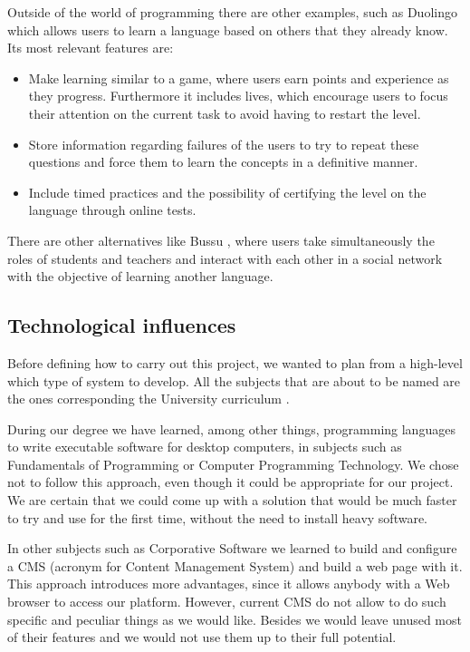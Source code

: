Outside of the world of programming there are other examples, such as Duolingo \cite{duolingo} which allows users to learn a language based on others that they already know. Its most relevant features are:

\begin{itemize}
\item
Make learning similar to a game, where users earn points and experience as they progress. Furthermore it includes lives, which encourage users to focus their attention on the current task to avoid having to restart the level.

\item
Store information regarding failures of the users to try to repeat these questions and force them to learn the concepts in a definitive manner.

\item
Include timed practices and the possibility of certifying the level on the language through online tests.
\end{itemize}

There are other alternatives like Bussu \cite{bussu}, where users take simultaneously the roles of students and teachers and interact with each other in a social network with the objective of learning another language.

\subsection{Technological influences\label{subsec:influences}}
Before defining how to carry out this project, we wanted to plan from a high-level which type of system to develop. All the subjects that are about to be named are the ones corresponding the University curriculum \cite{plan, boe}. 

During our degree we have learned, among other things, programming languages to write executable software for desktop computers, in subjects such as Fundamentals of Programming or Computer Programming Technology. We chose not to follow this approach, even though it could be appropriate for our project. We are certain that we could come up with a solution that would be much faster to try and use for the first time, without the need to install heavy software.

In other subjects such as Corporative Software we learned to build and configure a CMS (acronym for Content Management System) and build a web page with it. This approach introduces more advantages, since it allows anybody with a Web browser to access our platform. However, current CMS do not allow to do such specific and peculiar things as we would like. Besides we would leave unused most of their features and we would not use them up to their full potential.

